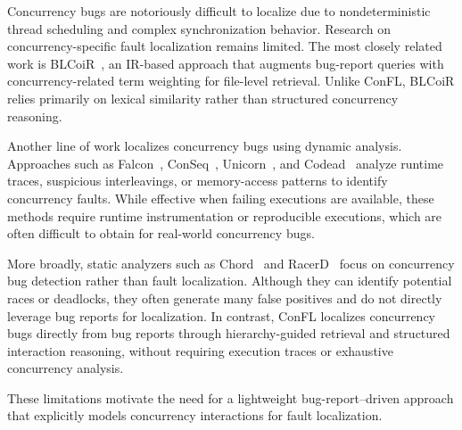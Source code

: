 Concurrency bugs are notoriously difficult to localize due to nondeterministic thread scheduling and complex synchronization behavior. Research on concurrency-specific fault localization remains limited. The most closely related work is BLCoiR~\cite{shao2023information}, an IR-based approach that augments bug-report queries with concurrency-related term weighting for file-level retrieval. Unlike ConFL, BLCoiR relies primarily on lexical similarity rather than structured concurrency reasoning.

Another line of work localizes concurrency bugs using dynamic analysis. Approaches such as Falcon~\cite{cf1}, ConSeq~\cite{cf2}, Unicorn~\cite{cf3}, and Codead~\cite{cf4} analyze runtime traces, suspicious interleavings, or memory-access patterns to identify concurrency faults. While effective when failing executions are available, these methods require runtime instrumentation or reproducible executions, which are often difficult to obtain for real-world concurrency bugs.

More broadly, static analyzers such as Chord~\cite{naik2006effective} and RacerD~\cite{blackshear2018racerd} focus on concurrency bug detection rather than fault localization. Although they can identify potential races or deadlocks, they often generate many false positives and do not directly leverage bug reports for localization. In contrast, ConFL localizes concurrency bugs directly from bug reports through hierarchy-guided retrieval and structured interaction reasoning, without requiring execution traces or exhaustive concurrency analysis.

These limitations motivate the need for a lightweight bug-report–driven approach that explicitly models concurrency interactions for fault localization.
